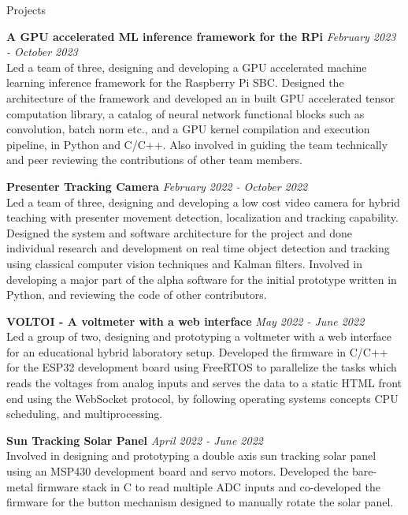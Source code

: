 \documentclass[
	11pt, %
]{./../assets/resume} %
\begin{document}

\begin{rSection}{Projects}

{\bf A GPU accelerated ML inference framework for the RPi} \hfill {\em February 2023 - October 2023} \\
Led a team of three, designing and developing a GPU accelerated machine learning inference framework for the Raspberry Pi SBC. Designed the architecture of the framework and developed an in built GPU accelerated tensor computation library, a catalog of neural network functional blocks such as convolution, batch norm etc., and a GPU kernel compilation and execution pipeline, in Python and C/C++. Also involved in guiding the team technically and peer reviewing the contributions of other team members.

{\bf Presenter Tracking Camera} \hfill {\em February 2022 - October 2022} \\
Led a team of three, designing and developing a low cost video camera for hybrid teaching with presenter movement detection, localization and tracking capability. Designed the system and software architecture for the project and done individual research and development on real time object detection and tracking using classical computer vision techniques and Kalman filters. Involved in developing a major part of the alpha software for the initial prototype written in Python, and reviewing the code of other contributors.

{\bf VOLTOI - A voltmeter with a web interface} \hfill {\em May 2022 - June 2022} \\
Led a group of two, designing and prototyping a voltmeter with a web interface for an educational hybrid laboratory setup. Developed the firmware in C/C++ for the ESP32 development board using FreeRTOS to parallelize the tasks which reads the voltages from analog inputs and serves the data to a static HTML front end using the WebSocket protocol, by following operating systems concepts CPU scheduling, and multiprocessing.

{\bf Sun Tracking Solar Panel} \hfill {\em April 2022 - June 2022} \\
Involved in designing and prototyping a double axis sun tracking solar panel using an MSP430 development board and servo motors. Developed the bare-metal firmware stack in C to read multiple ADC inputs and co-developed the firmware for the button mechanism designed to manually rotate the solar panel.


\end{rSection}
\end{document}
